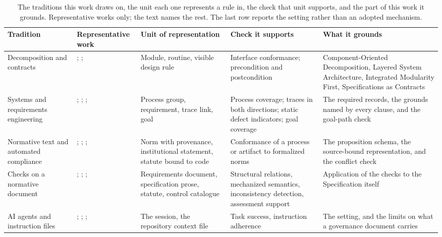 \begin{table}[t]
\centering
\small
\setlength{\tabcolsep}{4pt}
\caption{The traditions this work draws on, the unit each one represents a rule in, the check that unit supports, and the part of this work it grounds. Representative works only; the text names the rest. The last row reports the setting rather than an adopted mechanism.}
\label{tab:relatedwork}
\begin{tabular}{>{\raggedright\arraybackslash}p{1.15in}>{\raggedright\arraybackslash}p{1.35in}>{\raggedright\arraybackslash}p{1.25in}>{\raggedright\arraybackslash}p{1.35in}>{\raggedright\arraybackslash}p{1.40in}}
\toprule
\textbf{Tradition} & \textbf{Representative work} & \textbf{Unit of representation} & \textbf{Check it supports} & \textbf{What it grounds} \\
\midrule
Decomposition and contracts
& \citet{parnas1972}; \citet{meyer1992}; \citet{baldwinclark2000}
& Module, routine, visible design rule
& Interface conformance; precondition and postcondition
& Component-Oriented Decomposition, Layered System Architecture, Integrated Modularity First, Specifications as Contracts \\
\addlinespace
Systems and requirements engineering
& \citet{iso15288}; \citet{gotel1994}; \citet{femmer2017}; \citet{vanlamsweerde2001}
& Process group, requirement, trace link, goal
& Process coverage; traces in both directions; static defect indicators; goal coverage
& The required records, the grounds named by every clause, and the goal-path check \\
\addlinespace
Normative text and automated compliance
& \citet{legalruleml}; \citet{frantz2021}; \citet{catala2021}; \citet{governatori2016}
& Norm with provenance, institutional statement, statute bound to code
& Conformance of a process or artifact to formalized norms
& The proposition schema, the source-bound representation, and the conflict check \\
\addlinespace
Checks on a normative document
& \citet{grosser2022}; \citet{watt2018}; \citet{yadamsuren2026}; \citet{piez2019}
& Requirements document, specification prose, statute, control catalogue
& Structural relations, mechanized semantics, inconsistency detection, assessment support
& Application of the checks to the Specification itself \\
\addlinespace
AI agents and instruction files
& \citet{mittal2026}; \citet{chatlatanagulchai2025readme}; \citet{gloaguen2026}; \citet{wallace2024}
& The session, the repository context file
& Task success, instruction adherence
& The setting, and the limits on what a governance document carries \\
\bottomrule
\end{tabular}
\end{table}
